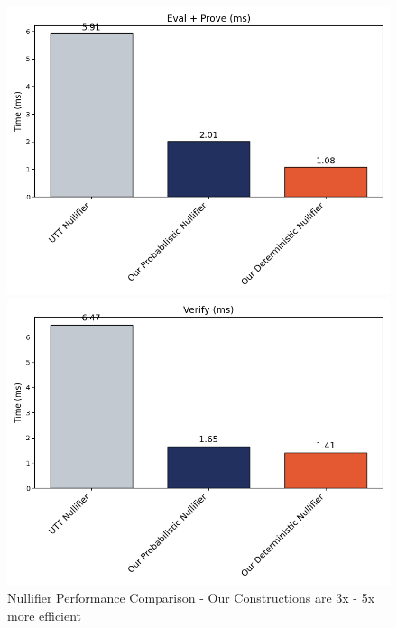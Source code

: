 \begin{figure}[ht]
    \begin{minipage}{0.48\textwidth}
        \centering
         \includegraphics[width=\textwidth]{figures/chap4_private_nullifier_eval_prove.png}        
    \end{minipage}
    \hfill
    \begin{minipage}{0.48\textwidth}
        \centering
       \includegraphics[width=\textwidth]{figures/chap4_private_nullifier_verify.png}
    \end{minipage}
    
    \caption[Our Nullifier Constructions are 3x - 5x more efficient]{Nullifier Performance Comparison - Our Constructions are 3x - 5x more efficient}
    \label{fig:nullifiers_figure}
\end{figure}






















